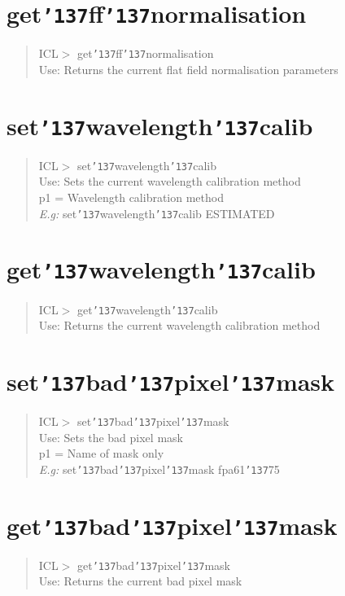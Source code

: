\documentclass[a4paper]{book}
\renewcommand{\_}{{\tt\char'137}}
\begin{document}
\section{get\_ff\_normalisation}
\begin{quote}
ICL$>$ get\_ff\_normalisation \\
Use: Returns the current flat field normalisation parameters
\end{quote}
\section{set\_wavelength\_calib}
\begin{quote}
ICL$>$ set\_wavelength\_calib \\
Use: Sets the current wavelength calibration method \\
p1 = Wavelength calibration method \\
{\em E.g:} set\_wavelength\_calib ESTIMATED
\end{quote}
\section{get\_wavelength\_calib}
\begin{quote}
ICL$>$ get\_wavelength\_calib \\
Use: Returns the current wavelength calibration method
\end{quote}
\section{set\_bad\_pixel\_mask}
\begin{quote}
ICL$>$ set\_bad\_pixel\_mask \\
Use: Sets the bad pixel mask \\
p1 = Name of mask only \\
{\em E.g:} set\_bad\_pixel\_mask fpa61\_75
\end{quote}
\section{get\_bad\_pixel\_mask}
\begin{quote}
ICL$>$ get\_bad\_pixel\_mask \\
Use: Returns the current bad pixel mask
\end{quote}
\end{document}
